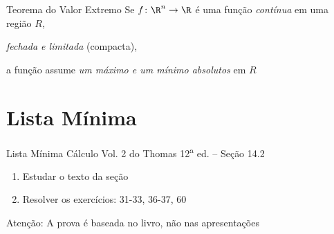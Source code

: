 \documentclass[fleqn,utf8,aspectratio=169,12pt]{beamer}
\begin{document}
\begin{frame}{Teorema do Valor Extremo}
  Se \(f\colon\R^n\to\R\) é uma função \emph{contínua}
  em uma região $R$,

  \pause
  \emph{fechada e limitada} (compacta),

  \pause
  a função assume \emph{um máximo e um mínimo absolutos} em $R$
\end{frame}

\section{Lista Mínima}

\begin{frame}{Lista Mínima}
  Cálculo Vol. 2 do Thomas 12\textsuperscript{a} ed. -- Seção 14.2
  \begin{enumerate}
    \item Estudar o texto da seção
    \item Resolver os exercícios: 31-33, 36-37, 60
  \end{enumerate}

  \vfill
  Atenção: A prova é baseada no livro, não nas apresentações
\end{frame}

\end{document}
